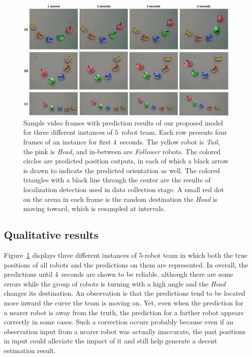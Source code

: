 \documentclass[letterpaper, 10 pt, conference]{ieeeconf}  %
\begin{document}
	\begin{figure}[t]
		\centering
		\includegraphics[width=2.\columnwidth]{fig_preds}
		\caption{Sample video frames with prediction results of our proposed model
			for three different instances of $5$~robot team.
			Each row presents four frames of an instance for first $4$~seconds.
			The yellow robot is \emph{Tail}, the pink is \emph{Head}, and
			in-between are \emph{Follower} robots.
			The colored circles are predicted position outputs, in each
			of which a black arrow is drawn to indicate the predicted orientation as well.
			The colored triangles with a black line through the center are the
			results of localization detection used in data collection stage.
			A small red dot on the arena in each frame is the random destination the
			\emph{Head} is moving toward, which is resampled at intervals.
		}
		\label{fig:preds}
	\end{figure}


	\subsection{Qualitative results}
	\label{sec:qualitative_results}

	Figure~\ref{fig:preds} displays three different instances of $5$-robot team
	in which both the true positions of all robots and the predictions on them are represented.
	In overall, the predictions
	until $4$~seconds are shown to be reliable, although there are some errors while the
	group of robots is turning with a high angle and the \emph{Head} changes its destination.
	An observation is that the predictions tend to be located more inward the curve the team is moving on.
	Yet, even when the prediction for a nearer robot is away from the truth, the prediction
	for a farther robot appears correctly in some cases.
	Such a correction occurs probably because even if an observation input from a nearer robot was
	actually inaccurate, the past positions in input could alleviate the impact of it and still
	help generate a decent estimation result.
\end{document}
